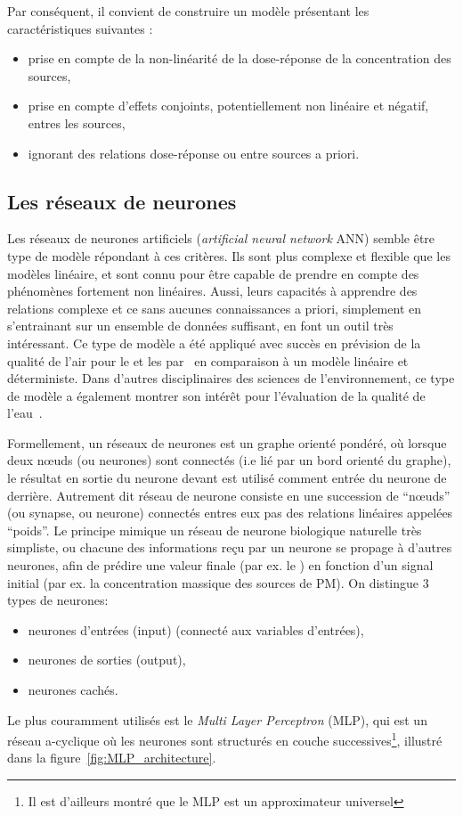 Par conséquent, il convient de construire un modèle présentant les caractéristiques
suivantes :
\begin{itemize}
    \item prise en compte de la non-linéarité de la dose-réponse de la concentration des
        sources,
    \item prise en compte d'effets conjoints, potentiellement non linéaire et négatif,
        entres les sources,
    \item ignorant des relations dose-réponse ou entre sources a priori.
\end{itemize}

\subsection{Les réseaux de neurones}%
\label{sub:les_réseaux_de_neurones}

Les réseaux de neurones artificiels (\textit{artificial neural network} ANN) semble être
type de modèle répondant à ces critères. Ils sont plus complexe et flexible que les
modèles linéaire, et sont connu pour être capable de prendre en compte des phénomènes
fortement non linéaires. Aussi, leurs capacités à apprendre des relations complexe et ce
sans aucunes connaissances a priori, simplement en s'entrainant sur un ensemble de données
suffisant, en font un outil très intéressant.
Ce type de modèle a été appliqué avec succès en prévision de la qualité de l'air pour le
 et les \PMdix{} par~\cite{kukkonenExtensive2003} en comparaison à un modèle
linéaire et déterministe. Dans d'autres disciplinaires des sciences de l'environnement, ce
type de modèle a également montrer son intérêt pour l'évaluation de la qualité de
l'eau~\autocite{nathanApplication2017}.

Formellement, un réseaux de neurones est un graphe orienté pondéré, où lorsque deux
nœuds (ou neurones) sont connectés (i.e lié par un bord orienté du graphe), le résultat en
sortie du neurone devant est utilisé comment entrée du neurone de derrière.
Autrement dit réseau de neurone consiste en une succession de ``nœuds'' (ou synapse, ou
neurone) connectés entres eux pas des relations linéaires appelées ``poids''. Le principe
mimique un réseau de neurone biologique naturelle très simpliste, ou chacune des
informations reçu par un neurone se propage à d'autres neurones, afin de prédire une
valeur finale (par ex. le \POv) en fonction d'un signal initial (par ex. la
concentration massique des sources de PM).
On distingue 3 types de neurones:
\begin{itemize}
    \item neurones d'entrées (input) (connecté aux variables d'entrées),
    \item neurones de sorties (output),
    \item neurones cachés.
\end{itemize}
Le plus couramment utilisés est le \textit{Multi Layer Perceptron} (MLP), qui est un
réseau a-cyclique où les neurones sont structurés en couche successives\footnote{Il est
d'ailleurs montré que le MLP est un approximateur universel}, illustré dans la
figure~\ref{fig:MLP_architecture}.

